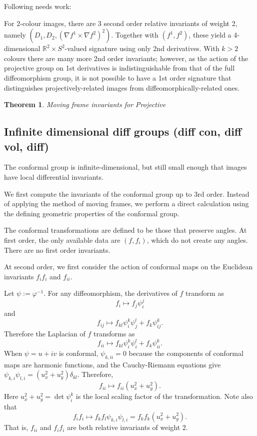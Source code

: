 \documentclass{article}
\newtheorem{theorem}{Theorem}
\begin{document}
{\color{red}Following needs work:}

For $2$-colour images, there are 3  second order relative invariants of weight 2,
namely $(D_1,D_2,(\nabla f^1\times \nabla f^2)^2)$. Together with $(f^1,f^2)$, these yield
a 4-dimensional $\mathbb{R}^2\times S^2$-valued signature using only 2nd derivatives.
With $k>2$ colours there are many more 2nd order invariants; however, as the action
of the projective group on 1st derivatives is indistinguishable from that of the full
diffeomorphism group, it is not possible to have a 1st order signature that distinguishes
projectively-related images from diffeomorphically-related ones.


\begin{theorem}
  Moving frame invariants for Projective
\end{theorem}

\subsection{Infinite dimensional diff groups (diff con, diff vol, diff)}

The conformal
group is infinite-dimensional, but still small enough that images have local differential invariants.

We first compute the invariants of the conformal group up to 3rd order. Instead of applying the method
of moving frames, we perform a direct calculation using the defining geometric properties of the conformal
group.

The conformal transformations are defined to be those that preserve angles. At first order, the only
available data are $(f,f_i)$, which do not create any angles. There are no first order invariants.

At second order, we first consider the action of conformal maps on the Euclidean invariants
$f_i f_i$ and $f_{ii}$.

Let $\psi := \varphi^{-1}$. For any diffeomorphism, the derivatives of $f$ transform as
$$f_i \mapsto f_j \psi^j_i$$
and
$$f_{ij} \mapsto f_{kl} \psi^k_i\psi^l_j + f_{k}\psi^k_{ij}.$$
Therefore the Laplacian of $f$ transforms as
$$ f_{ii} \mapsto f_{kl} \psi^k_i \psi^l_i + f_k \psi^k_{ii}.$$
When $\psi=u + i v$ is conformal, $\psi_{k,ii}=0$ because the components of conformal maps are harmonic functions,
and the Cauchy-Riemann equations give $\psi_{k,i}\psi_{l,i} = (u_x^2 + u_y^2)\delta_{kl}$. Therefore,
$$ f_{ii} \mapsto f_{ii}(u_x^2+u_y^2).$$
Here $u_x^2+u_y^2=\det\psi^k_i$ is the local scaling factor of the transformation.
Note also that
$$f_i f_i \mapsto f_k f_l \psi_{k,i} \psi_{l,i} = f_k f_k (u_x^2 + u_y^2).$$
That is, $f_{ii}$ and $f_i f_i$ are both relative invariants of weight 2.
\end{document}
